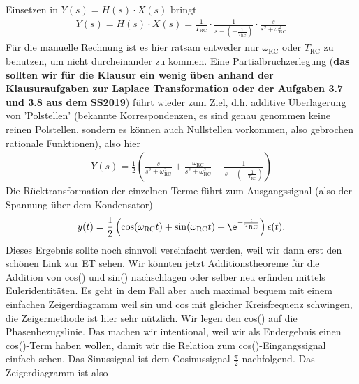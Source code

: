 \begin{Loesung}
\begin{itemize}
Einsetzen in $Y(s) = H(s)\cdot X(s)$ bringt
%
\begin{align}
Y(s) = H(s) \cdot X(s) = \frac{1}{T_\mathrm{RC}} \cdot \frac{1}{s - (-\frac{1}{T_\mathrm{RC}})} \cdot \frac{s}{s^2+\omega_\mathrm{RC}^2}
\end{align}
Für die manuelle Rechnung ist es hier ratsam entweder nur $\omega_\mathrm{RC}$ oder
$T_\mathrm{RC}$ zu benutzen, um nicht durcheinander zu kommen.
%
Eine Partialbruchzerlegung (\textbf{das sollten wir für die Klausur ein wenig üben
anhand der Klausuraufgaben zur Laplace Transformation oder der Aufgaben 3.7 und 3.8
aus dem SS2019})
 führt wieder zum Ziel, d.h. additive Überlagerung von
'Polstellen' (bekannte Korrespondenzen, es sind genau genommen keine reinen Polstellen,
sondern es können auch Nullstellen vorkommen, also gebrochen rationale Funktionen),
also hier
\begin{align}
Y(s) = \frac{1}{2} \left(
\frac{s}{s^2+\omega_\mathrm{RC}^2} + \frac{\omega_\mathrm{RC}}{s^2+\omega_\mathrm{RC}^2} - \frac{1}{s-(-\frac{1}{T_\mathrm{RC}})}
\right)
\end{align}
%
Die Rücktransformation der einzelnen Terme führt zum Ausgangssignal (also der
Spannung über dem Kondensator)
\begin{align}
  y(t) = \frac{1}{2}\left(
  \cos(\omega_\mathrm{RC} t) + \sin(\omega_\mathrm{RC} t) + \e^{-\frac{t}{T_\mathrm{RC}}}
  \right) \epsilon(t).
\end{align}
Dieses Ergebnis sollte noch sinnvoll vereinfacht werden, weil wir dann erst
den schönen Link zur ET sehen.
%
Wir könnten jetzt Additionstheoreme für die Addition von cos() und sin() nachschlagen
oder selber neu erfinden mittels Euleridentitäten.
%
Es geht in dem Fall aber auch maximal bequem mit einem einfachen Zeigerdiagramm
weil sin und cos mit gleicher Kreisfrequenz schwingen, die Zeigermethode ist hier
sehr nützlich. Wir legen den cos() auf die Phasenbezugslinie.
Das machen wir intentional, weil wir als Endergebnis
einen cos()-Term haben wollen, damit wir die Relation zum cos()-Eingangssignal
einfach sehen. Das Sinussignal ist dem Cosinussignal $\frac{\pi}{2}$ nachfolgend.
Das Zeigerdiagramm ist also
\begin{center}
\end{center}
\end{itemize}
\end{Loesung}
